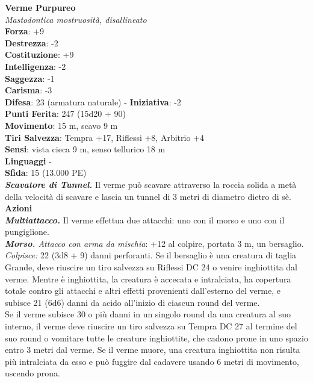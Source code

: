 \begin{multicols}{2}
\medskip\textbf{Verme Purpureo}\\
\emph{Mastodontica mostruosità, disallineato}\\
\textbf{Forza}: +9\\
\textbf{Destrezza}: -2\\
\textbf{Costituzione}: +9\\
\textbf{Intelligenza}: -2\\
\textbf{Saggezza}: -1\\
\textbf{Carisma}: -3\\
\textbf{Difesa}: 23 (armatura naturale) - \textbf{Iniziativa}: -2\\
\textbf{Punti Ferita}: 247 (15d20 + 90)\\
\textbf{Movimento}: 15 m, scavo 9 m\\
\textbf{Tiri Salvezza}: Tempra +17, Riflessi +8, Arbitrio +4\\
\textbf{Sensi}: vista cieca 9 m, senso tellurico 18 m\\
\textbf{Linguaggi} -\\
\textbf{Sfida}: 15 (13.000 PE)\smallskip\\
\emph{\textbf{Scavatore di Tunnel.}} Il verme può scavare attraverso la roccia solida a metà della velocità di scavare e lascia un tunnel di 3 metri di diametro dietro di sè.\\
\smallskip\textbf{Azioni}\\
\emph{\textbf{Multiattacco.}} Il verme effettua due attacchi: uno con il morso e uno con il pungiglione.\\
\emph{\textbf{Morso.} Attacco con arma da mischia}: +12 al colpire, portata 3 m, un bersaglio.\\
\emph{Colpisce:} 22 (3d8 + 9) danni perforanti. Se il bersaglio è una creatura di taglia Grande, deve riuscire un tiro salvezza su Riflessi DC  24 o venire inghiottita dal verme. Mentre è inghiottita, la creatura è accecata e intralciata, ha copertura totale contro gli attacchi e altri effetti provenienti dall'esterno del verme, e subisce 21 (6d6) danni da acido all'inizio di ciascun round del verme.\\
Se il verme subisce 30 o più danni in un singolo round da una creatura al suo interno, il verme deve riuscire un tiro salvezza su Tempra DC  27 al termine del suo round o vomitare tutte le creature inghiottite, che cadono prone in uno spazio entro 3 metri dal verme. Se il verme muore, una creatura inghiottita non risulta più intralciata da esso e può fuggire dal cadavere usando 6 metri di movimento, uscendo prona.\\


\end{multicols}
